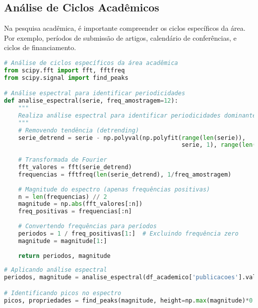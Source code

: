 \subsection{Análise de Ciclos Acadêmicos}

\begin{examplebox}
Na pesquisa acadêmica, é importante compreender os ciclos específicos da área. Por exemplo, períodos de submissão de artigos, calendário de conferências, e ciclos de financiamento.
\end{examplebox}

\begin{pythonbox}
\begin{lstlisting}[language=Python]
# Análise de ciclos específicos da área acadêmica
from scipy.fft import fft, fftfreq
from scipy.signal import find_peaks

# Análise espectral para identificar periodicidades
def analise_espectral(serie, freq_amostragem=12):
    """
    Realiza análise espectral para identificar periodicidades dominantes
    """
    # Removendo tendência (detrending)
    serie_detrend = serie - np.polyval(np.polyfit(range(len(serie)), 
                                                  serie, 1), range(len(serie)))
    
    # Transformada de Fourier
    fft_valores = fft(serie_detrend)
    frequencias = fftfreq(len(serie_detrend), 1/freq_amostragem)
    
    # Magnitude do espectro (apenas frequências positivas)
    n = len(frequencias) // 2
    magnitude = np.abs(fft_valores[:n])
    freq_positivas = frequencias[:n]
    
    # Convertendo frequências para períodos
    periodos = 1 / freq_positivas[1:]  # Excluindo frequência zero
    magnitude = magnitude[1:]
    
    return periodos, magnitude
\end{lstlisting}
\end{pythonbox}

\begin{pythonbox}
\begin{lstlisting}[language=Python]
# Aplicando análise espectral
periodos, magnitude = analise_espectral(df_academico['publicacoes'].values)

# Identificando picos no espectro
picos, propriedades = find_peaks(magnitude, height=np.max(magnitude)*0.1)
\end{lstlisting}
\end{pythonbox}

